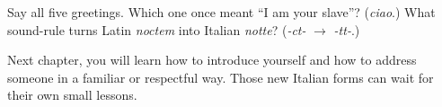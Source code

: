 \begin{tcolorbox}[breakable,colback=teal!4,colframe=teal!35!black,title={Before you move on}]
Say all five greetings. Which one once meant \textquotedblleft{}I am your slave\textquotedblright{}? (\emph{ciao}.) What sound-rule turns Latin \emph{noctem} into Italian \emph{notte}? (\emph{-ct-} $\to$ \emph{-tt-}.)

Next chapter, you will learn how to introduce yourself and how to address someone in a familiar or respectful way. Those new Italian forms can wait for their own small lessons.
\end{tcolorbox}
